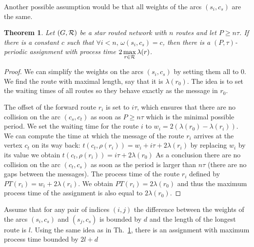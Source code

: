\documentclass[10pt, conference, letterpaper]{IEEEtran}
\newtheorem{theorem}{Theorem}
\begin{document}
	Another possible assumption would be that all weights of the arcs $(s_i,c_s)$ are the same.
	
	 \begin{theorem}\label{th:asym}
	 Let $(G,{\cal R})$ be a star routed network with $n$ routes and let $P \geq n\tau$. If there is a constant $c$ such that $\forall i < n, \,\omega(s_i,c_s) = c$, then there is a $(P,\tau)$-periodic assignment with process time $2\, \displaystyle{\max_{r\in {\cal R}} \lambda(r)}$.
	 \end{theorem}
      \begin{proof}
      
        We can simplify the weights on the arcs $(s_i,c_s)$ by setting them all to $0$.
        We find the route with maximal length, say that it is $\lambda(r_0)$. The idea is to 
        set the waiting times of all routes so they behave exactly as the message in $r_0$.
        
        The offset of the forward route $r_i$ is set to $i\tau$, which ensures that there are no collision on the arc $(c_s,c_t)$ as soon as $P \geq n\tau$ which is the minimal possible period. We set the waiting time for the route $i$ to $w_i = 2(\lambda(r_{0}) - \lambda(r_{i}))$. We can compute the time at which the message of the route $r_i$ arrives at the vertex $c_t$ on its way back: $t(c_t,\rho(r_i)) = w_i + i\tau + 2\lambda(r_{i})$
        by replacing $w_i$ by its value we obtain $t(c_t,\rho(r_i)) =  i\tau + 2\lambda(r_{0})$
        As a conclusion there are no collision on the arc $(c_t,c_s)$ as soon as the 
        period is larger than $n\tau$ (there are no gaps between the messages).
        The process time of the route $r_i$ defined by $PT(r_i) = w_i + 2\lambda(r_{i}) $. We obtain $PT(r_i) = 2\lambda(r_{0})$ and thus the maximum process time of the assignment is also equal to $2\lambda(r_0)$.
     \end{proof}
     
     Assume that for any pair of indices $(i,j)$ the difference between the weights of the arcs $(s_i,c_s)$ and $(s_j,c_s)$ is bounded by $d$ and the length of the longest route is $l$. Using the same idea as in Th.~\ref{th:asym}, there is an assignment with maximum process time bounded by  $2l + d$
     
\end{document}
